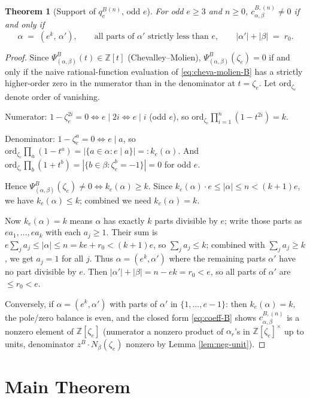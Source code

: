 \documentclass[11pt]{article}
\newtheorem{theorem}{Theorem}
\theoremstyle{remark}
\newcommand{\qeB}{q_e^{B}}
\newcommand{\zetae}{\zeta_e}
\newcommand{\ZZ}{\mathbb{Z}}
\newcommand{\PsiB}{\Psi^{B}}
\newcommand{\zB}{z^{B}}
\begin{document}
\begin{theorem}[Support of $\qeB^{(n)}$, odd $e$]\label{thm:support-B}
For odd $e \ge 3$ and $n \ge 0$, $c^{B, (n)}_{\alpha, \beta} \ne 0$ if and only if
\[
  \alpha \;=\; (e^{k},\, \alpha'), \qquad \text{all parts of } \alpha' \text{ strictly less than } e, \qquad |\alpha'| + |\beta| \;=\; r_0.
\]
\end{theorem}

\begin{proof}
Since $\PsiB_{(\alpha, \beta)}(t) \in \ZZ[t]$ (Chevalley--Molien), $\PsiB_{(\alpha, \beta)}(\zetae) = 0$ if and only if the naive rational-function evaluation of \eqref{eq:cheva-molien-B} has a strictly higher-order zero in the numerator than in the denominator at $t = \zetae$. Let $\mathrm{ord}_{\zetae}$ denote order of vanishing.

Numerator: $1 - \zetae^{2i} = 0 \iff e \mid 2i \iff e \mid i$ (odd $e$), so $\mathrm{ord}_{\zetae}\prod_{i=1}^n(1 - t^{2i}) = k$.

Denominator: $1 - \zetae^{a} = 0 \iff e \mid a$, so $\mathrm{ord}_{\zetae}\prod_a(1 - t^a) = |\{a \in \alpha : e \mid a\}| =: k_e(\alpha)$. And $\mathrm{ord}_{\zetae}\prod_b(1 + t^b) = |\{b \in \beta : \zetae^b = -1\}| = 0$ for odd $e$.

Hence $\PsiB_{(\alpha,\beta)}(\zetae) \ne 0 \iff k_e(\alpha) \ge k$. Since $k_e(\alpha) \cdot e \le |\alpha| \le n < (k+1)e$, we have $k_e(\alpha) \le k$; combined we need $k_e(\alpha) = k$.

Now $k_e(\alpha) = k$ means $\alpha$ has exactly $k$ parts divisible by $e$; write those parts as $e a_1, \ldots, e a_k$ with each $a_j \ge 1$. Their sum is $e \sum_j a_j \le |\alpha| \le n = ke + r_0 < (k+1)e$, so $\sum_j a_j \le k$; combined with $\sum_j a_j \ge k$, we get $a_j = 1$ for all $j$. Thus $\alpha = (e^{k}, \alpha')$ where the remaining parts $\alpha'$ have no part divisible by $e$. Then $|\alpha'| + |\beta| = n - ek = r_0 < e$, so all parts of $\alpha'$ are $\le r_0 < e$.

Conversely, if $\alpha = (e^{k}, \alpha')$ with parts of $\alpha'$ in $\{1, \ldots, e-1\}$: then $k_e(\alpha) = k$, the pole/zero balance is even, and the closed form \eqref{eq:coeff-B} shows $c^{B, (n)}_{\alpha, \beta}$ is a nonzero element of $\ZZ[\zetae]$ (numerator a nonzero product of $\alpha_r$'s in $\ZZ[\zetae]^{\times}$ up to units, denominator $\zB \cdot N_\beta(\zetae)$ nonzero by Lemma \ref{lem:neg-unit}).
\end{proof}

\section{Main Theorem}
\end{document}
